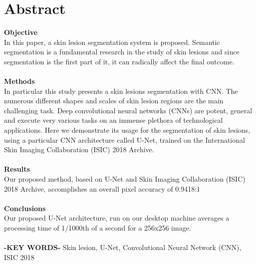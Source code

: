 \documentclass[12pt,a4paper,oneside]{report} %
\begin{document}
\newpage

\tableofcontents %


%

\newpage%
{} 
 
\chapter*{Abstract}
\setcounter{secnumdepth}{0}

{\large{\bf Objective}}\\

In this paper, a skin lesion segmentation system is proposed. Semantic segmentation is a fundamental research in the study of skin lesions and since segmentation is the first part of it, it can radically affect the final outcome.
\\
\\
{\large{\bf Methods}}\\

In particular this study presents a skin lesions segmentation with CNN. The numerous different shapes and scales of skin lesion regions are the main challenging task.
Deep convolutional neural networks (CNNs) are potent, general and execute very various tasks on an immense plethora of technological applications. Here we demonstrate its usage for the segmentation of skin lesions, using a particular CNN architecture called U-Net, trained on the International Skin Imaging Collaboration (ISIC) 2018 Archive.
\\
\\
{\large{\bf Results}}\\
 
Our proposed method, based on U-Net and Skin Imaging Collaboration (ISIC) 2018 Archive, accomplishes an overall pixel accuracy of 0.9418:1\\
\\
{\large{\bf Conclusions}}\\

Our proposed U-Net architecture, run on our desktop machine averages a processing time of 1/1000th of a second for a 256x256 image.
\\
\\
{\bf -KEY WORDS-} Skin lesion, U-Net, Convolutional Neural Network (CNN), ISIC 2018 
\end{document}
